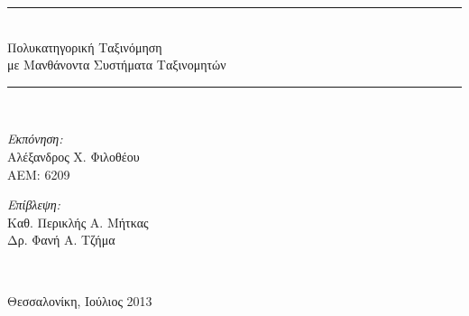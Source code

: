 \begin{titlepage}
\begin{center}
  \rule{350pt}{4pt} \\[0.4cm]
    \LARGE{Πολυκατηγορική Ταξινόμηση \\[0.4cm] με Μανθάνοντα Συστήματα Ταξινομητών} \\[0.4cm]
  \rule{350pt}{4pt} \\[6cm]

  \begin{minipage}{0.4\textwidth}
  \begin{flushleft} \large
  \emph{Εκπόνηση:} \\
 	 Αλέξανδρος Χ. Φιλοθέου \\
  	ΑΕΜ: 6209
  \end{flushleft}
  \end{minipage}
  \begin{minipage}{0.4\textwidth}
  \begin{flushright} \large
  \emph{Επίβλεψη:} \\
  Καθ. Περικλής Α. Μήτκας\\
  Δρ. Φανή Α. Τζήμα
  \end{flushright}
  \end{minipage}
  \\[1cm]
  \vfill

  \large Θεσσαλονίκη, Ιούλιος 2013

\end{center}
\end{titlepage}
\newevenside


\newevenside

\newevenside


\newevenside



\setcounter{tocdepth}{2}
\tableofcontents

\listoffigures

\listoftables

\listofalgorithms
\newevenside
{}

